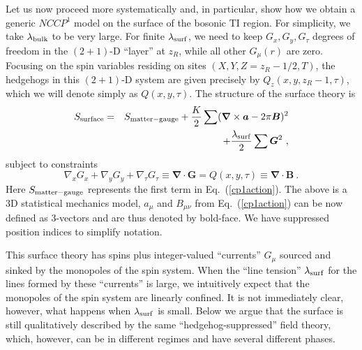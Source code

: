 \documentclass[prb,twocolumn]{revtex4-1}
\begin{document}
Let us now proceed more systematically and, in particular, show how we obtain a generic $NCCP^1$ model on the surface of the bosonic TI region.  For simplicity, we take $\lambda_{\rm bulk}$ to be very large. For finite $\lambda_{\rm surf}$, we need to keep $G_x, G_y, G_\tau$ degrees of freedom in the $(2+1)$-D ``layer'' at $z_R$, while all other $G_\mu(r)$ are zero.  Focusing on the spin variables residing on sites $(X, Y, Z=z_R-1/2, T)$, the hedgehogs in this $(2+1)$-D system are given precisely by $Q_z(x, y, z_R-1, \tau)$, which we will denote simply as $Q(x, y, \tau)$.  The structure of the surface theory is
\begin{eqnarray}
S_{\rm surface} &=& S_{\rm matter-gauge} + \frac{K}{2}\sum  ({\bm\nabla} \times {\bm a} - 2\pi {\bm B})^2\nonumber \\
&& + \frac{\lambda_{\rm surf}}{2}\sum  {\bm G}^2 ~,
\label{lesikeqn}
\end{eqnarray}
subject to constraints
\begin{equation}
 \nabla_x G_x + \nabla_y G_y + \nabla_\tau G_\tau \equiv {\bm \nabla} \cdot {\bm G} = Q(x,y,\tau) \equiv {\bm \nabla} \cdot {\bm B} ~.
\end{equation}
Here $S_{\rm matter-gauge}$ represents the first term in Eq.~(\ref{cp1action}). The above is a 3D statistical mechanics model, $a_\mu$ and $B_{\mu\nu}$ from Eq.~(\ref{cp1action}) can be now defined as 3-vectors and are thus denoted by bold-face. We have suppressed position indices to simplify notation.

This surface theory has spins plus integer-valued ``currents'' $G_\mu$ sourced and sinked by the monopoles of the spin system.  When the ``line tension'' $\lambda_{\rm surf}$ for the lines formed by these ``currents'' is large, we intuitively expect that the monopoles of the spin system are linearly confined.  It is not immediately clear, however, what happens when $\lambda_{\rm surf}$ is small.  Below we argue that the surface is still qualitatively described by the same ``hedgehog-suppressed'' field theory, which, however, can be in different regimes and have several different phases.
\end{document}
